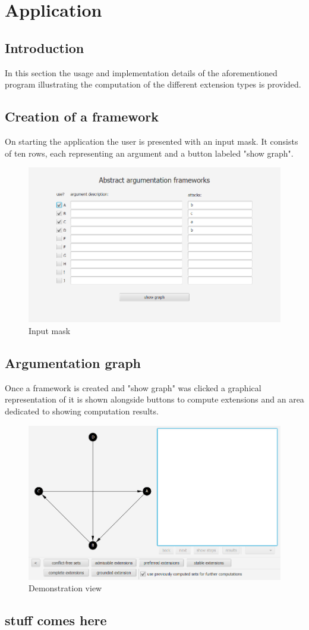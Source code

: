 \documentclass{article}
\begin{document}
\section{Application}
\subsection{Introduction}
In this section the usage and implementation details of the aforementioned program illustrating the computation of the different extension types is provided.

\subsection{Creation of a framework}
On starting the application the user is presented with an input mask. It consists of ten rows, each representing an argument and a button labeled "show graph".

\FloatBarrier
	\begin{figure}[!htb]
		\includegraphics[width=\linewidth]{pics/input.png}
		\caption{Input mask}
	\end{figure}
\FloatBarrier

\subsection{Argumentation graph}
Once a framework is created and "show graph" was clicked a graphical representation of it is shown alongside buttons to compute extensions and an area dedicated to showing computation results.

\FloatBarrier
	\begin{figure}[!htb]
		\includegraphics[width=\linewidth]{pics/demo.png}
		\caption{Demonstration view}
	\end{figure}
\FloatBarrier

\subsection{stuff comes here}
\end{document}
